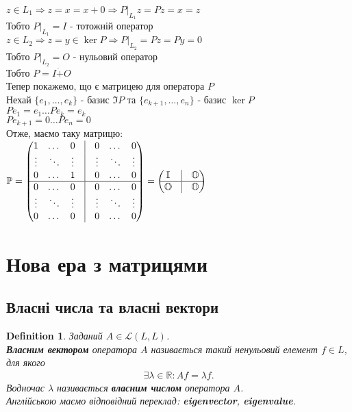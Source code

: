 \documentclass[a4paper, 10pt]{article}
\theoremstyle{theoremdd}
\newtheorem{definition}[theorem]{Definition}
\begin{document}
$z \in L_1 \Rightarrow z = x = x+0 \Rightarrow P|_{L_1}z = Pz = x = z$\\
Тобто $P|_{L_1} = I$ - тотожній оператор\\
$z \in L_2 \Rightarrow z = y \in \ker P \Rightarrow P|_{L_2} = Pz = Py = 0$\\
Тобто $P|_{L_2} = O$ - нульовий оператор\\
Тобто $P = I \dot{+} O$
\bigskip \\
Тепер покажемо, що є матрицею для оператора $P$\\
Нехай $\{e_1,\dots,e_k\}$ - базис $\Im P$ та $\{e_{k+1},\dots,e_n\}$ - базис $\ker P$\\
$Pe_1 = e_1 \dots Pe_k = e_k$\\
$Pe_{k+1} = 0 \dots Pe_n = 0$\\
Отже, маємо таку матрицю:\\
$\mathbb{P} = \begin{pmatrix}
1 & \dots & 0 & \vline & 0 & \dots & 0 \\
\vdots & \ddots & \vdots & \vline & \vdots & \ddots & \vdots \\
0 & \dots & 1 & \vline & 0 & \dots & 0 \\
\hline
0 & \dots & 0 & \vline & 0 & \dots & 0 \\
\vdots & \ddots & \vdots & \vline & \vdots & \ddots & \vdots \\
0 & \dots & 0 & \vline & 0 & \dots & 0 \\
\end{pmatrix} = \begin{pmatrix}
\mathbb{I}  & \vline & \mathbb{O} \\
 \hline
\mathbb{O} & \vline & \mathbb{O}
\end{pmatrix}$
\fi

\newpage
\setcounter{section}{3}
\setcounter{subsection}{0}
\section{Нова ера з матрицями}
\subsection{Власні числа та власні вектори}
\begin{definition}
Заданий $A \in \mathcal{L}(L,L)$.\\
\textbf{Власним вектором} оператора $A$ називається такий ненульовий елемент $f \in L$, для якого
\begin{align*}
\exists \lambda \in \mathbb{R}: Af = \lambda f.
\end{align*}
Водночас $\lambda$ називається \textbf{власним числом} оператора $A$.\\
Англійською маємо відповідний переклад: \textbf{eigenvector}, \textbf{eigenvalue}.
\end{definition}
\end{document}
